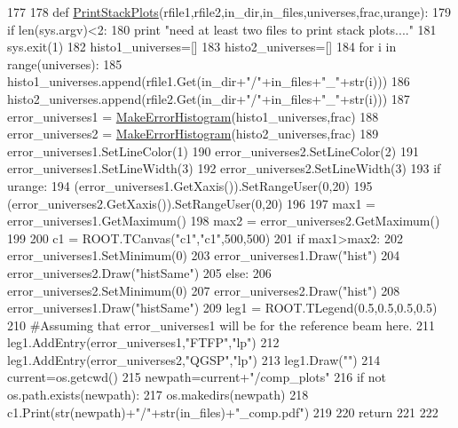\begin{DoxyCode}
177 
178 \textcolor{keyword}{def }\hyperlink{namespacedraw_uncertainties_a75534d4e7a659ff593417f2457bc3da4}{PrintStackPlots}(rfile1,rfile2,in\_dir,in\_files,universes,frac,urange):
179     \textcolor{keywordflow}{if} len(sys.argv)<2:
180         \textcolor{keywordflow}{print} \textcolor{stringliteral}{"need at least two files to print stack plots...."}
181         sys.exit(1)
182     histo1\_universes=[]
183     histo2\_universes=[]
184     \textcolor{keywordflow}{for} i \textcolor{keywordflow}{in} range(universes):
185         histo1\_universes.append(rfile1.Get(in\_dir+\textcolor{stringliteral}{"/"}+in\_files+\textcolor{stringliteral}{"\_"}+str(i)))
186         histo2\_universes.append(rfile2.Get(in\_dir+\textcolor{stringliteral}{"/"}+in\_files+\textcolor{stringliteral}{"\_"}+str(i)))
187     error\_universes1 = \hyperlink{namespacedraw_uncertainties_a71b82db5bc399553d8d56d4d8ce2b18e}{MakeErrorHistogram}(histo1\_universes,frac)
188     error\_universes2 = \hyperlink{namespacedraw_uncertainties_a71b82db5bc399553d8d56d4d8ce2b18e}{MakeErrorHistogram}(histo2\_universes,frac)
189     error\_universes1.SetLineColor(1)
190     error\_universes2.SetLineColor(2)
191     error\_universes1.SetLineWidth(3)
192     error\_universes2.SetLineWidth(3)
193     \textcolor{keywordflow}{if} urange:
194         (error\_universes1.GetXaxis()).SetRangeUser(0,20)
195         (error\_universes2.GetXaxis()).SetRangeUser(0,20)
196         
197     max1 = error\_universes1.GetMaximum()
198     max2 = error\_universes2.GetMaximum()
199 
200     c1 = ROOT.TCanvas(\textcolor{stringliteral}{"c1"},\textcolor{stringliteral}{"c1"},500,500)
201     \textcolor{keywordflow}{if} max1>max2:
202         error\_universes1.SetMinimum(0)
203         error\_universes1.Draw(\textcolor{stringliteral}{"hist"})
204         error\_universes2.Draw(\textcolor{stringliteral}{"histSame"})
205     \textcolor{keywordflow}{else}:
206         error\_universes2.SetMinimum(0)
207         error\_universes2.Draw(\textcolor{stringliteral}{"hist"})
208         error\_universes1.Draw(\textcolor{stringliteral}{"histSame"})
209     leg1 = ROOT.TLegend(0.5,0.5,0.5,0.5)
210     \textcolor{comment}{#Assuming that error\_universes1 will be for the reference beam here.}
211     leg1.AddEntry(error\_universes1,\textcolor{stringliteral}{"FTFP"},\textcolor{stringliteral}{"lp"})
212     leg1.AddEntry(error\_universes2,\textcolor{stringliteral}{"QGSP"},\textcolor{stringliteral}{"lp"})
213     leg1.Draw(\textcolor{stringliteral}{""})
214     current=os.getcwd()
215     newpath=current+\textcolor{stringliteral}{"/comp\_plots"}
216     \textcolor{keywordflow}{if} \textcolor{keywordflow}{not} os.path.exists(newpath):
217         os.makedirs(newpath)
218     c1.Print(str(newpath)+\textcolor{stringliteral}{"/"}+str(in\_files)+\textcolor{stringliteral}{"\_comp.pdf"})
219 
220     \textcolor{keywordflow}{return}
221 
222 

\end{DoxyCode}
